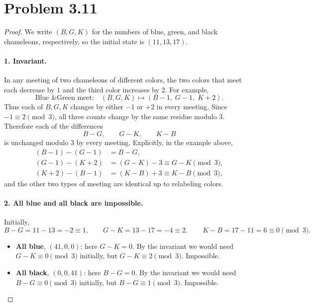 \documentclass[12pt]{article}
\begin{document}
\section*{Problem 3.11}
\begin{proof}
We write $(B, G, K)$ for the numbers of blue, green, and black chameleons,
respectively, so the initial state is $(11, 13, 17)$.
 
\paragraph{1. Invariant.}
In any meeting of two chameleons of different colors, the two colors that
meet each decrease by $1$ and the third color increases by $2$. For example,
\[
  \text{Blue \& Green meet:} \quad (B, G, K) \longmapsto (B-1,\; G-1,\; K+2).
\]
Thus each of $B, G, K$ changes by either $-1$ or $+2$ in every meeting. Since
$-1 \equiv 2 \pmod 3$, all three counts change by the same residue modulo $3$.
Therefore each of the differences
\[
  B - G, \qquad G - K, \qquad K - B
\]
is unchanged modulo $3$ by every meeting. Explicitly, in the example above,
\begin{align*}
  (B-1) - (G-1) &= B - G, \\
  (G-1) - (K+2) &= (G - K) - 3 \equiv G - K \pmod 3, \\
  (K+2) - (B-1) &= (K - B) + 3 \equiv K - B \pmod 3,
\end{align*}
and the other two types of meeting are identical up to relabeling colors.
 
\paragraph{2. All blue and all black are impossible.}
Initially,
\[
  B - G = 11 - 13 = -2 \equiv 1, \qquad
  G - K = 13 - 17 = -4 \equiv 2, \qquad
  K - B = 17 - 11 = 6 \equiv 0 \pmod 3.
\]
\begin{itemize}
  \item \textbf{All blue}, $(41, 0, 0)$: here $G - K = 0$. By the invariant we
  would need $G - K \equiv 0 \pmod 3$ initially, but $G - K \equiv 2 \pmod 3$.
  Impossible.
  \item \textbf{All black}, $(0, 0, 41)$: here $B - G = 0$. By the invariant we
  would need $B - G \equiv 0 \pmod 3$ initially, but $B - G \equiv 1 \pmod 3$.
  Impossible.
\end{itemize}
 

\end{proof}
\end{document}
